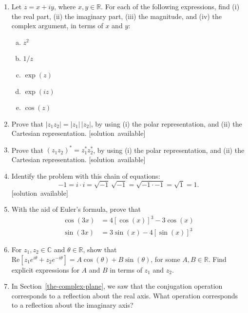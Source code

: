 \documentclass[10pt,a4paper]{article}
\begin{document}
\begin{enumerate}
\item
  Let $z = x + iy$, where $x, y \in \mathbb{R}$. For each of the
  following expressions, find (i) the real part, (ii) the imaginary
  part, (iii) the magnitude, and (iv) the complex argument, in terms of
  $x$ and $y$:

  \begin{enumerate}[(a)]
  \item $z^2$
  \item $1/z$
  \item $\exp(z)$
  \item $\exp(iz)$
  \item $\cos(z)$
  \end{enumerate}

\item
  Prove that $|z_1 z_2| = |z_1|\, |z_2|$, by using (i) the polar
  representation, and (ii) the Cartesian representation.
  \hfill{\scriptsize [solution~available]}

\item
  Prove that $(z_1 z_2)^* = z_1^* z_2^*$, by using (i) the polar
  representation, and (ii) the Cartesian representation.
  \hfill{\scriptsize [solution~available]}

\item
  Identify the problem with this chain of equations:
  \begin{equation*}
    -1 = i \cdot i =
    \sqrt{-1}\,\sqrt{-1} = \sqrt{-1 \cdot -1} = \sqrt{1} = 1. 
  \end{equation*}
  \vskip -0.19in
  \hfill{\scriptsize [solution~available]}

\item
  With the aid of Euler's formula, prove that
  \begin{align}
    \cos(3x) &= 4[\cos(x)]^3 -3\cos(x) \\
    \sin(3x) &= 3\sin(x)-4[\sin(x)]^3
  \end{align}

\item
  For $z_1, z_2 \in \mathbb{C}$ and $\theta \in \mathbb{R}$, show that
  $\mathrm{Re}\left[z_1 e^{i\theta} + z_2 e^{-i\theta}\right] = A
  \cos(\theta) + B \sin(\theta)$, for some $A, B \in \mathbb{R}$. Find
  explicit expressions for $A$ and $B$ in terms of $z_1$ and $z_2$.

\item
  In Section~\ref{the-complex-plane}, we saw that the conjugation
  operation corresponds to a reflection about the real axis. What
  operation corresponds to a reflection about the imaginary axis?


\end{enumerate}
\end{document}
